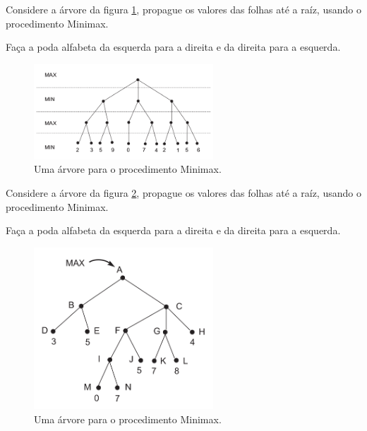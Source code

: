 \documentclass[12pt]{exam}
\begin{document}
\vspace{3em}

\begin{questions}

\question Considere a árvore da figura \ref{fig:treeGameMinMax01}, propague os valores das folhas até a raíz, usando o procedimento Minimax.

Faça a poda alfabeta da esquerda para a direita e da direita para a esquerda.

\begin{figure}[h]
    \centering
    \includegraphics[width=0.60\textwidth]{treeGameMinMax01}
    \caption{Uma árvore para o procedimento Minimax.}
    \label{fig:treeGameMinMax01}
\end{figure}




\break


\question Considere a árvore da figura \ref{fig:treeGameMinMax02}, propague os valores das folhas até a raíz, usando o procedimento Minimax.

Faça a poda alfabeta da esquerda para a direita e da direita para a esquerda.

\begin{figure}[h]
    \centering
    \includegraphics[width=0.60\textwidth]{treeGameMinMax02}
    \caption{Uma árvore para o procedimento Minimax.}
    \label{fig:treeGameMinMax02}
\end{figure}






\end{questions}
\end{document}
